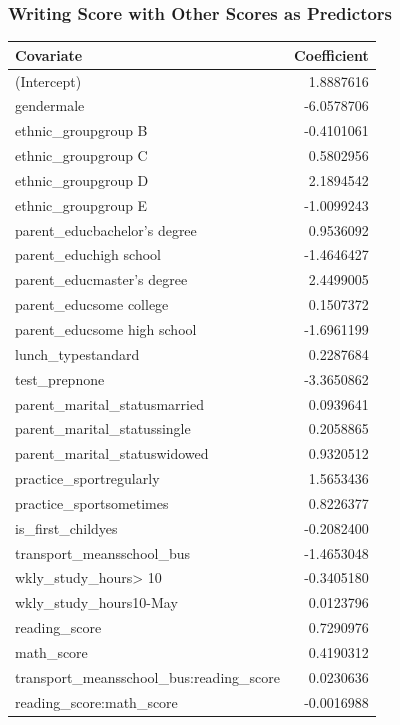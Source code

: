\documentclass[
]{article}
\begin{document}
\subsubsection{Writing Score with Other Scores as
Predictors}\label{writing-score-with-other-scores-as-predictors}

\begin{longtable}[]{@{}lr@{}}
\toprule\noalign{}
Covariate & Coefficient \\
\midrule\noalign{}
\endhead
\bottomrule\noalign{}
\endlastfoot
(Intercept) & 1.8887616 \\
gendermale & -6.0578706 \\
ethnic\_groupgroup B & -0.4101061 \\
ethnic\_groupgroup C & 0.5802956 \\
ethnic\_groupgroup D & 2.1894542 \\
ethnic\_groupgroup E & -1.0099243 \\
parent\_educbachelor's degree & 0.9536092 \\
parent\_educhigh school & -1.4646427 \\
parent\_educmaster's degree & 2.4499005 \\
parent\_educsome college & 0.1507372 \\
parent\_educsome high school & -1.6961199 \\
lunch\_typestandard & 0.2287684 \\
test\_prepnone & -3.3650862 \\
parent\_marital\_statusmarried & 0.0939641 \\
parent\_marital\_statussingle & 0.2058865 \\
parent\_marital\_statuswidowed & 0.9320512 \\
practice\_sportregularly & 1.5653436 \\
practice\_sportsometimes & 0.8226377 \\
is\_first\_childyes & -0.2082400 \\
transport\_meansschool\_bus & -1.4653048 \\
wkly\_study\_hours\textgreater{} 10 & -0.3405180 \\
wkly\_study\_hours10-May & 0.0123796 \\
reading\_score & 0.7290976 \\
math\_score & 0.4190312 \\
transport\_meansschool\_bus:reading\_score & 0.0230636 \\
reading\_score:math\_score & -0.0016988 \\
\end{longtable}
\end{document}
